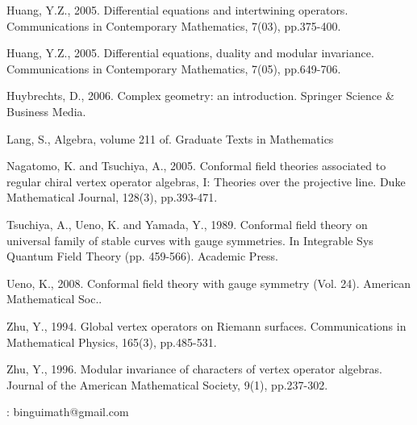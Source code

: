 \documentclass[12pt,a4paper,notitlepage]{report}
\theoremstyle{definition}
\theoremstyle{plain}
\numberwithin{equation}{section}
\begin{document}
\begin{thebibliography}{999999}
Huang, Y.Z., 2005. Differential equations and intertwining operators. Communications in Contemporary Mathematics, 7(03), pp.375-400.

Huang, Y.Z., 2005. Differential equations, duality and modular invariance. Communications in Contemporary Mathematics, 7(05), pp.649-706.

Huybrechts, D., 2006. Complex geometry: an introduction. Springer Science \& Business Media.



Lang, S., Algebra, volume 211 of. Graduate Texts in Mathematics

Nagatomo, K. and Tsuchiya, A., 2005. Conformal field theories associated to regular chiral vertex operator algebras, I: Theories over the projective line. Duke Mathematical Journal, 128(3), pp.393-471.

Tsuchiya, A., Ueno, K. and Yamada, Y., 1989. Conformal field theory on universal family of stable curves with gauge symmetries. In Integrable Sys Quantum Field Theory (pp. 459-566). Academic Press.

Ueno, K., 2008. Conformal field theory with gauge symmetry (Vol. 24). American Mathematical Soc..

Zhu, Y., 1994. Global vertex operators on Riemann surfaces. Communications in Mathematical Physics, 165(3), pp.485-531.

Zhu, Y., 1996. Modular invariance of characters of vertex operator algebras. Journal of the American Mathematical Society, 9(1), pp.237-302.


	

	
\end{thebibliography}

: binguimath@gmail.com
\end{document}
